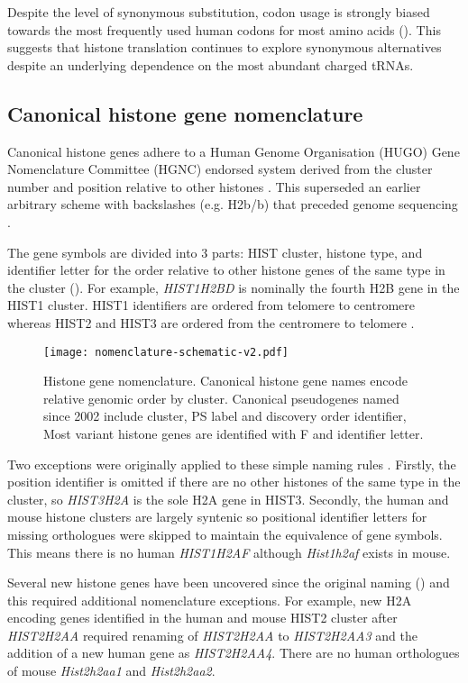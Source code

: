 	Despite the level of synonymous substitution, 
	codon usage is strongly biased towards the most frequently used human codons for most amino acids (). 
	This suggests that histone translation continues to explore synonymous alternatives 
	despite an underlying dependence on the most abundant charged tRNAs.

\subsection{Canonical histone gene nomenclature}
	Canonical histone genes adhere to a Human Genome Organisation (HUGO) Gene Nomenclature Committee (HGNC) 
	endorsed system derived from the cluster number and position relative to other histones \citep{Marzluff02}. 
	This superseded an earlier arbitrary scheme with backslashes (e.g. H2b/b) 
	that preceded genome sequencing \citep{AlbigGenomics1997,AlbigHumangen1997}.

	The gene symbols are divided into 3 parts: 
	HIST cluster, histone type, and identifier letter
	for the order relative to other histone genes of the same type in the cluster ().
	For example, \textit{HIST1H2BD} is nominally the fourth H2B gene in the HIST1 cluster.
	HIST1 identifiers are ordered from telomere to centromere 
	whereas HIST2 and HIST3 are ordered from the centromere to telomere \citep{Marzluff02}.

\begin{figure*}
	\centering
	\texttt{[image: nomenclature-schematic-v2.pdf]}
	\caption{Histone gene nomenclature. 
	Canonical histone gene names encode relative genomic order by cluster.
	Canonical pseudogenes named since 2002 include cluster, PS label and discovery order identifier,
	Most variant histone genes are identified with F and identifier letter.}
	\label{fig:nomenclature}
\end{figure*}

	Two exceptions were originally applied to these simple naming rules \citep{Marzluff02}. 
	Firstly, the position identifier is omitted if there are no other histones of the same type in the cluster, 
	so \textit{HIST3H2A} is the sole H2A gene in HIST3. 
	Secondly, the human and mouse histone clusters are largely syntenic 
	so positional identifier letters for missing orthologues were skipped to maintain the equivalence of gene symbols.
	This means there is no human \textit{HIST1H2AF} although \textit{Hist1h2af} exists in mouse.

	Several new histone genes have been uncovered since the original naming () 
	and this required additional nomenclature exceptions.
	For example, new H2A encoding genes identified in the human and mouse HIST2 cluster after \textit{HIST2H2AA} 
	required renaming of \textit{HIST2H2AA} to \textit{HIST2H2AA3} 
	and the addition of a new human gene as \textit{HIST2H2AA4}. 
	There are no human orthologues of mouse \textit{Hist2h2aa1} and \textit{Hist2h2aa2}.

